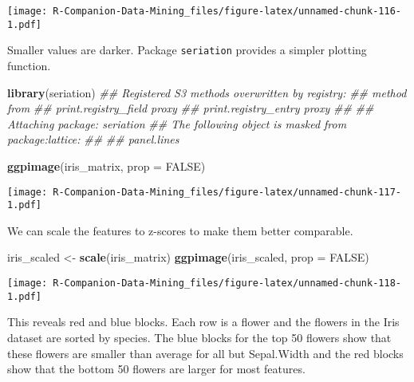 \documentclass[
  notitlepage]{book}
\newenvironment{Shaded}{\begin{snugshade}}{\end{snugshade}}
\newcommand{\CommentTok}[1]{\textcolor[rgb]{0.56,0.35,0.01}{\textit{#1}}}
\newcommand{\DataTypeTok}[1]{\textcolor[rgb]{0.13,0.29,0.53}{#1}}
\newcommand{\KeywordTok}[1]{\textcolor[rgb]{0.13,0.29,0.53}{\textbf{#1}}}
\newcommand{\NormalTok}[1]{#1}
\newcommand{\OtherTok}[1]{\textcolor[rgb]{0.56,0.35,0.01}{#1}}
\newcommand{\StringTok}[1]{\textcolor[rgb]{0.31,0.60,0.02}{#1}}
\begin{document}
\texttt{[image: R-Companion-Data-Mining\_files/figure-latex/unnamed-chunk-116-1.pdf]}

Smaller values are darker. Package \texttt{seriation} provides a simpler
plotting function.

\begin{Shaded}
\begin{Highlighting}[]
\KeywordTok{library}\NormalTok{(seriation)}
\CommentTok{\#\# Registered S3 methods overwritten by \textquotesingle{}registry\textquotesingle{}:}
\CommentTok{\#\#   method               from }
\CommentTok{\#\#   print.registry\_field proxy}
\CommentTok{\#\#   print.registry\_entry proxy}
\CommentTok{\#\# }
\CommentTok{\#\# Attaching package: \textquotesingle{}seriation\textquotesingle{}}
\CommentTok{\#\# The following object is masked from \textquotesingle{}package:lattice\textquotesingle{}:}
\CommentTok{\#\# }
\CommentTok{\#\#     panel.lines}
\end{Highlighting}
\end{Shaded}

\begin{Shaded}
\begin{Highlighting}[]
\KeywordTok{ggpimage}\NormalTok{(iris\_matrix, }\DataTypeTok{prop =} \OtherTok{FALSE}\NormalTok{)}
\end{Highlighting}
\end{Shaded}

\texttt{[image: R-Companion-Data-Mining\_files/figure-latex/unnamed-chunk-117-1.pdf]}

We can scale the features to z-scores to make them better comparable.

\begin{Shaded}
\begin{Highlighting}[]
\NormalTok{iris\_scaled \textless{}{-}}\StringTok{ }\KeywordTok{scale}\NormalTok{(iris\_matrix)}
\KeywordTok{ggpimage}\NormalTok{(iris\_scaled, }\DataTypeTok{prop =} \OtherTok{FALSE}\NormalTok{)}
\end{Highlighting}
\end{Shaded}

\texttt{[image: R-Companion-Data-Mining\_files/figure-latex/unnamed-chunk-118-1.pdf]}

This reveals red and blue blocks. Each row is a flower and the flowers
in the Iris dataset are sorted by species. The blue blocks for the top
50 flowers show that these flowers are smaller than average for all but
Sepal.Width and the red blocks show that the bottom 50 flowers are
larger for most features.
\end{document}
